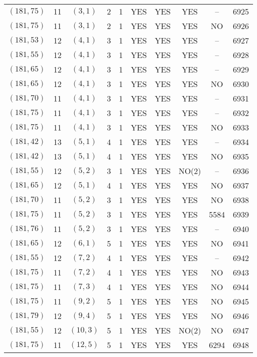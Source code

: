 \begin{longtable}{|c|c|c|c|c|c|c|c|c|c|}
$(181, 75)$ & 11 & $(3, 1)$ & 2 & 1 & YES & YES & YES & -- & 6925\\
$(181, 75)$ & 11 & $(3, 1)$ & 2 & 1 & YES & YES & YES & NO & 6926\\
$(181, 53)$ & 12 & $(4, 1)$ & 3 & 1 & YES & YES & YES & -- & 6927\\
$(181, 55)$ & 12 & $(4, 1)$ & 3 & 1 & YES & YES & YES & -- & 6928\\
$(181, 65)$ & 12 & $(4, 1)$ & 3 & 1 & YES & YES & YES & -- & 6929\\
$(181, 65)$ & 12 & $(4, 1)$ & 3 & 1 & YES & YES & YES & NO & 6930\\
$(181, 70)$ & 11 & $(4, 1)$ & 3 & 1 & YES & YES & YES & -- & 6931\\
$(181, 75)$ & 11 & $(4, 1)$ & 3 & 1 & YES & YES & YES & -- & 6932\\
$(181, 75)$ & 11 & $(4, 1)$ & 3 & 1 & YES & YES & YES & NO & 6933\\
$(181, 42)$ & 13 & $(5, 1)$ & 4 & 1 & YES & YES & YES & -- & 6934\\
$(181, 42)$ & 13 & $(5, 1)$ & 4 & 1 & YES & YES & YES & NO & 6935\\
$(181, 55)$ & 12 & $(5, 2)$ & 3 & 1 & YES & YES & NO(2) & -- & 6936\\
$(181, 65)$ & 12 & $(5, 1)$ & 4 & 1 & YES & YES & YES & NO & 6937\\
$(181, 70)$ & 11 & $(5, 2)$ & 3 & 1 & YES & YES & YES & NO & 6938\\
$(181, 75)$ & 11 & $(5, 2)$ & 3 & 1 & YES & YES & YES & 5584 & 6939\\
$(181, 76)$ & 11 & $(5, 2)$ & 3 & 1 & YES & YES & YES & -- & 6940\\
$(181, 65)$ & 12 & $(6, 1)$ & 5 & 1 & YES & YES & YES & NO & 6941\\
$(181, 55)$ & 12 & $(7, 2)$ & 4 & 1 & YES & YES & YES & -- & 6942\\
$(181, 75)$ & 11 & $(7, 2)$ & 4 & 1 & YES & YES & YES & NO & 6943\\
$(181, 75)$ & 11 & $(7, 3)$ & 4 & 1 & YES & YES & YES & NO & 6944\\
$(181, 75)$ & 11 & $(9, 2)$ & 5 & 1 & YES & YES & YES & NO & 6945\\
$(181, 79)$ & 12 & $(9, 4)$ & 5 & 1 & YES & YES & YES & NO & 6946\\
$(181, 55)$ & 12 & $(10, 3)$ & 5 & 1 & YES & YES & NO(2) & NO & 6947\\
$(181, 75)$ & 11 & $(12, 5)$ & 5 & 1 & YES & YES & YES & 6294 & 6948\\

\end{longtable}
